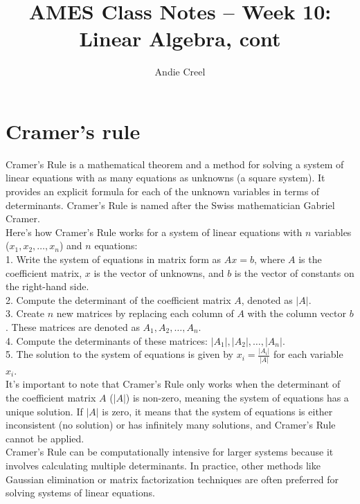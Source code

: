 \documentclass{article}
\title{AMES Class Notes -- Week 10: Linear Algebra, cont}
\author{Andie Creel}
\begin{document}
\maketitle



\section{Cramer's rule}

Cramer's Rule is a mathematical theorem and a method for solving a system of linear equations with as many equations as unknowns (a square system). It provides an explicit formula for each of the unknown variables in terms of determinants. Cramer's Rule is named after the Swiss mathematician Gabriel Cramer.\\

Here's how Cramer's Rule works for a system of linear equations with $n$ variables ($x_1, x_2, \ldots, x_n$) and $n$ equations:\\

1. Write the system of equations in matrix form as $Ax = b$, where $A$ is the coefficient matrix, $x$ is the vector of unknowns, and $b$ is the vector of constants on the right-hand side.\\

2. Compute the determinant of the coefficient matrix $A$, denoted as $|A|$.\\

3. Create $n$ new matrices by replacing each column of $A$ with the column vector $b$. These matrices are denoted as $A_1, A_2, \ldots, A_n$.\\

4. Compute the determinants of these matrices: $|A_1|, |A_2|, \ldots, |A_n|$.\\

5. The solution to the system of equations is given by $x_i = \frac{|A_i|}{|A|}$ for each variable $x_i$.\\

It's important to note that Cramer's Rule only works when the determinant of the coefficient matrix $A$ ($|A|$) is non-zero, meaning the system of equations has a unique solution. If $|A|$ is zero, it means that the system of equations is either inconsistent (no solution) or has infinitely many solutions, and Cramer's Rule cannot be applied.\\

Cramer's Rule can be computationally intensive for larger systems because it involves calculating multiple determinants. In practice, other methods like Gaussian elimination or matrix factorization techniques are often preferred for solving systems of linear equations.\\
\end{document}
